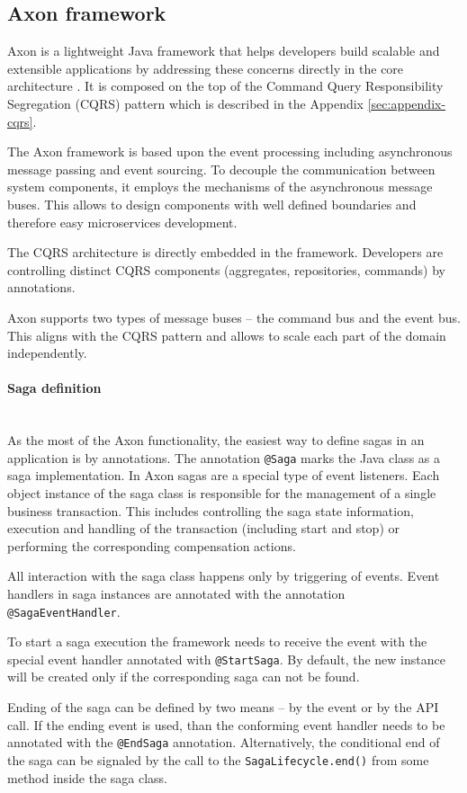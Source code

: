 \documentclass[oneside,
  digital, %
  table,   %
  nolof,     %
  nolot,     %
]{fithesis3}
\newcommand{\newlinepar}[1]{\paragraph{#1}\needspace{4\baselineskip}\mbox{}\\}
\begin{document}
\subsection{Axon framework}

Axon is a lightweight Java framework that helps developers build scalable and extensible applications by addressing these concerns directly in the core architecture \cite{axon_framework}. It is composed on the top of the Command Query Responsibility Segregation (CQRS) pattern which is described in the Appendix \ref{sec:appendix-cqrs}.

The Axon framework is based upon the event processing including asynchronous message passing and event sourcing. To decouple the communication between system components, it employs the mechanisms of the asynchronous message buses. This allows to design components with well defined boundaries and therefore easy microservices development.

The CQRS architecture is directly embedded in the framework. Developers are controlling distinct CQRS components (aggregates, repositories, commands) by annotations. 

Axon supports two types of message buses -- the command bus and the event bus. This aligns with the CQRS pattern and allows to scale each part of the domain independently.

\newlinepar{Saga definition}

As the most of the Axon functionality, the easiest way to define sagas in an application is by annotations. The annotation \texttt{@Saga} marks the Java class as a saga implementation. In Axon sagas are a special type of event listeners. Each object instance of the saga class is responsible for the management of a single business transaction. This includes controlling the saga state information, execution and handling of the transaction (including start and stop) or performing the corresponding compensation actions.

All interaction with the saga class happens only by triggering of events. Event handlers in saga instances are annotated with the annotation \texttt{@SagaEventHandler}. 

To start a saga execution the framework needs to receive the event with the special event handler annotated with \texttt{@StartSaga}. By default, the new instance will be created only if the corresponding saga can not be found.

Ending of the saga can be defined by two means -- by the event or by the API call. If the ending event is used, than the conforming event handler needs to be annotated with the \texttt{@EndSaga} annotation. Alternatively, the conditional end of the saga can be signaled by the call to the \texttt{SagaLifecycle.end()} from some method inside the saga class.
\end{document}
